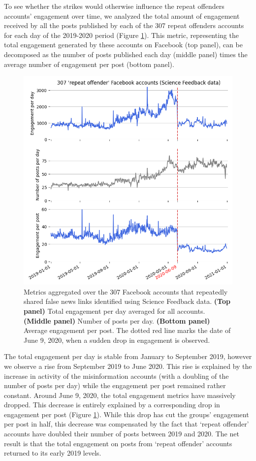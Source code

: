 \documentclass[review]{elsarticle}
\begin{document}
To see whether the strikes would otherwise influence the repeat offenders accounts' engagement over time, we analyzed the total amount of engagement received by all the posts published by each of the 307 repeat offenders accounts for each day of the 2019-2020 period (Figure \ref{repeat_average_timeseries}). 
This metric, representing the total engagement generated by these accounts on Facebook (top panel), can be decomposed as the number of posts published each day (middle panel) times the average number of engagement per post (bottom panel).

\begin{figure}[!h]
\centering
\includegraphics[scale=0.5]{./../figure/sf_average_timeseries.png}
\caption{
Metrics aggregated over the 307 Facebook accounts that repeatedly shared false news links identified using Science Feedback data.
{\bf(Top panel)} Total engagement per day averaged for all accounts.
{\bf(Middle panel)} Number of posts per day. 
{\bf(Bottom panel)} Average engagement per post. 
The dotted red line marks the date of June 9, 2020, when a sudden drop in engagement is observed.
}
\label{repeat_average_timeseries}
\end{figure}

The total engagement per day is stable from January to September 2019, however we observe a rise from September 2019 to June 2020. 
This rise is explained by the increase in activity of the misinformation accounts (with a doubling of the number of posts per day) while the engagement per post remained rather constant.
Around June 9, 2020, the total engagement metrics have massively dropped.
This decrease is entirely explained by a corresponding drop in engagement per post (Figure \ref{repeat_average_timeseries}).
While this drop has cut the groups' engagement per post in half, this decrease was compensated by the fact that `repeat offender' accounts have doubled their number of posts between 2019 and 2020.
The net result is that the total engagement on posts from `repeat offender' accounts returned to its early 2019 levels.
\end{document}
